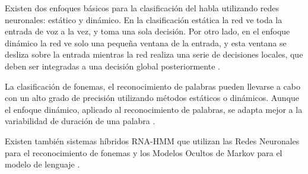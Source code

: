 Existen dos enfoques b\'asicos para la clasificaci\'on del habla utilizando redes neuronales: 
est\'atico y din\'amico. En la clasificaci\'on est\'atica la red ve toda la entrada de voz a la vez,
y toma una sola decisi\'on. Por otro lado, en el enfoque din\'amico la red ve solo una peque\~na 
ventana de la entrada, y esta ventana se desliza sobre la entrada mientras la red realiza una 
serie de decisiones locales, que deben ser integradas a una decisi\'on global 
posteriormente \cite{TebelskisSpeech1995}.

La clasificaci\'on de fonemas, el reconocimiento de palabras pueden llevarse a cabo con un alto
grado de precisi\'on utilizando m\'etodos est\'aticos o din\'amicos. Aunque el enfoque din\'amico,
aplicado al reconocimiento de palabras, se adapta mejor a la variabilidad de duraci\'on de una 
palabra \cite{TebelskisSpeech1995}.

Existen tambi\'en sistemas h\'ibridos RNA-HMM que utilizan las Redes Neuronales para el reconocimiento de
fonemas y los Modelos Ocultos de Markov para el modelo de lenguaje \cite{VimalaReview2012}.
